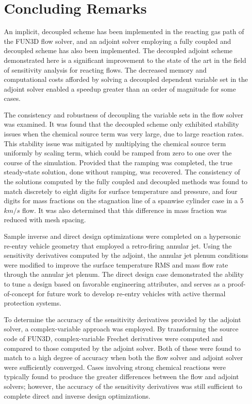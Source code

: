 \chapter{Concluding Remarks}
\label{chapter-ten}

An implicit, decoupled scheme has been implemented in the reacting gas path of
the FUN3D flow solver, and an adjoint solver employing a fully coupled and
decoupled scheme has also been implemented.  The decoupled adjoint scheme
demonstrated here is a significant improvement to the state of the art in the
field of sensitivity analysis for reacting flows.  The decreased memory and
computational costs afforded by solving a decoupled dependent variable set in
the adjoint solver enabled a speedup greater than an order of magnitude for some
cases.  

The consistency and robustness of decoupling the variable sets in the flow
solver was examined.  It was found that the decoupled scheme only exhibited
stability issues when the chemical source term was very large, due to large
reaction rates.  This stability issue was mitigated by multiplying the chemical
source term uniformly by scaling term, which could be ramped from zero to one
over the course of the simulation.  Provided that the ramping was completed, the
true steady-state solution, done without ramping, was recovered.  The
consistency of the solutions computed by the fully coupled and decoupled methods
was found to match discretely to eight digits for surface temperature and pressure,
and four digits for mass fractions on the stagnation line of a spanwise
cylinder case in a 5 $km/s$ flow.  It was also determined that this difference
in mass fraction was reduced with mesh spacing.

Sample inverse and direct design optimizations were completed on a hypersonic
re-entry vehicle geometry that employed a retro-firing annular jet.  Using the
sensitivity derivatives computed by the adjoint, the annular jet plenum
conditions were modified to improve the surface temperature RMS and mass flow
rate through the annular jet plenum.  The direct design case demonstrated the
ability to tune a design based on favorable engineering attributes, and serves
as a proof-of-concept for future work to develop re-entry vehicles with active
thermal protection systems.

To determine the accuracy of the sensitivity derivatives provided by the adjoint
solver, a complex-variable approach was employed.  By transforming the source
code of FUN3D, complex-variable Frechet derivatives were computed and compared
to those computed by the adjoint solver.  Both of these were found to match to a
high degree of accuracy when both the flow solver and adjoint solver were
sufficiently converged.  Cases involving strong chemical reactions were
typically found to produce the greater differences between the flow and adjoint
solvers; however, the accuracy of the sensitivity derivatives was still
sufficient to complete direct and inverse design optimizations.

